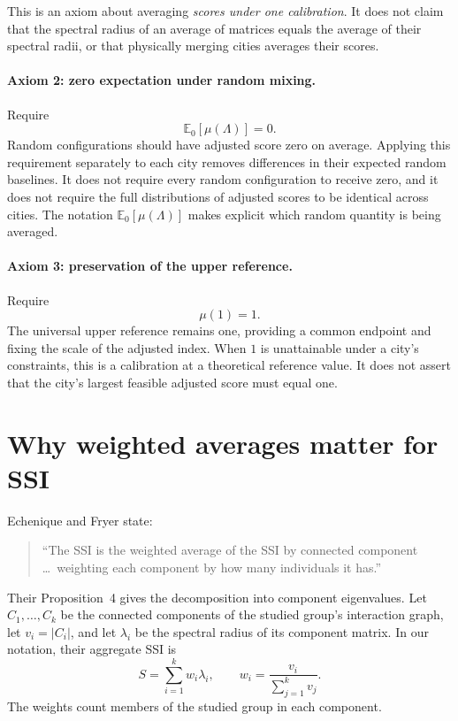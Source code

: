 \documentclass[11pt]{article}
\newcommand{\E}{\mathbb{E}}
\begin{document}
This is an axiom about averaging \emph{scores under one calibration}. It does
not claim that the spectral radius of an average of matrices equals the average
of their spectral radii, or that physically merging cities averages their scores.

\paragraph{Axiom 2: zero expectation under random mixing.}
Require
\begin{equation}
 \boxed{\E_0[\mu(\Lambda)]=0.}
 \label{eq:zero}
\end{equation}
Random configurations should have adjusted score zero on average. Applying
this requirement separately to each city removes differences in their expected
random baselines. It does not require every random configuration to receive
zero, and it does not require the full distributions of adjusted scores to be
identical across cities. The notation $\E_0[\mu(\Lambda)]$ makes explicit which
random quantity is being averaged.

\paragraph{Axiom 3: preservation of the upper reference.}
Require
\begin{equation}
 \boxed{\mu(1)=1.}
 \label{eq:upper}
\end{equation}
The universal upper reference remains one, providing a common endpoint and
fixing the scale of the adjusted index. When $1$ is unattainable under a city's
constraints, this is a calibration at a theoretical reference value. It does
not assert that the city's largest feasible adjusted score must equal one.

\section{Why weighted averages matter for SSI}
\label{sec:components}

Echenique and Fryer state:
\begin{quote}
``The SSI is the weighted average of the SSI by connected component
\ldots\ weighting each component by how many individuals it has.''
\end{quote}
\hfill\cite[footnote 9, author-posted manuscript p.~14]{EF}

Their Proposition~4 gives the decomposition into component eigenvalues.
Let $C_1,\ldots,C_k$ be the connected components of the studied group's
interaction graph, let $v_i=|C_i|$, and let $\lambda_i$ be the spectral radius
of its component matrix. In our notation, their aggregate SSI is
\begin{equation}
 S=\sum_{i=1}^{k}w_i\lambda_i,
 \qquad w_i=\frac{v_i}{\sum_{j=1}^{k}v_j}.
 \label{eq:EF}
\end{equation}
The weights count members of the studied group in each component.
\end{document}
